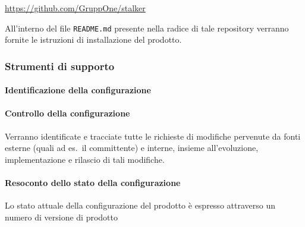 \documentclass[../../norme-di-progetto.tex]{subfiles}
\begin{document}
\begin{center}
  \href{https://github.com/GruppOne/stalker}{https://github.com/GruppOne/stalker}
\end{center}

All'interno del file \verb|README.md| presente nella radice di tale repository verranno fornite le istruzioni di installazione del prodotto.


\subsubsection{Strumenti di supporto}%
\label{subs:gestione_della_configurazione/strumenti_di_supporto}



\paragraph{Identificazione della configurazione}%
\label{par:identificazione_della_configurazione}



\paragraph{Controllo della configurazione}%
\label{par:controllo_della_configurazione}

Verranno identificate e tracciate tutte le richieste di modifiche pervenute da fonti esterne (quali ad es.\ il committente) e interne, insieme all'evoluzione, implementazione e rilascio di tali modifiche.


\paragraph{Resoconto dello stato della configurazione}%
\label{par:resoconto_dello_stato_della_configurazione}

Lo stato attuale della configurazione del prodotto è espresso attraverso un numero di versione di prodotto

\end{document}
